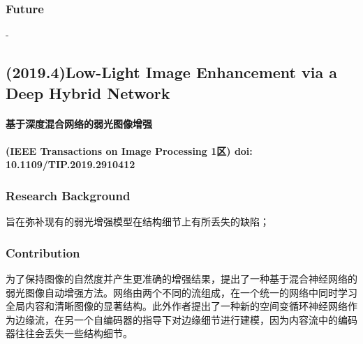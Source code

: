 \documentclass[a4paper, 10pt]{article}
\begin{document}
			\subsubsection{Future}
			
			-
			
		\subsection{(2019.4)Low-Light Image Enhancement via a Deep Hybrid Network}
		
		\paragraph{基于深度混合网络的弱光图像增强}
		
		\paragraph{(IEEE Transactions on Image Processing 1区) doi: 10.1109/TIP.2019.2910412}
		
			\subsubsection{Research Background}
			
			旨在弥补现有的弱光增强模型在结构细节上有所丢失的缺陷；
			
			\subsubsection{Contribution}

			为了保持图像的自然度并产生更准确的增强结果，提出了一种基于混合神经网络的弱光图像自动增强方法。网络由两个不同的流组成，在一个统一的网络中同时学习全局内容和清晰图像的显著结构。此外作者提出了一种新的空间变循环神经网络作为边缘流，在另一个自编码器的指导下对边缘细节进行建模，因为内容流中的编码器往往会丢失一些结构细节。
			
\end{document}
